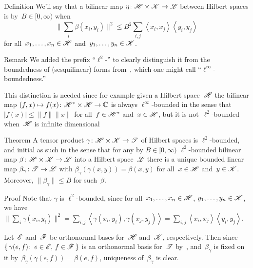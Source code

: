 \documentclass[a]{subfiles}
\begin{document}
\begin{parsec}%
\begin{point}{Definition}%
We'll say that a bilinear map $\eta\colon\mathscr{H}\times\mathscr{K}\to\mathscr{L}$
between Hilbert spaces
is 
by~$B\in [0,\infty)$
when
\begin{equation*}
	\|\sum_{i}\beta(x_i,y_i)\|^2
\leq B^2 \sum_{i,j}\left<x_i,x_j\right>\left<y_i,y_j\right>
\end{equation*}
for all~$x_1,\dotsc,x_n\in \mathscr{H}$
and~$y_1,\dotsc,y_n\in\mathscr{K}$.
\begin{point}{Remark}%
We added the prefix ``$\ell^2$-''
to clearly distinguish
it from the boundedness
of (sesquilinear) forms from~,
which one might call ``$\ell^\infty$-boundedness.''

This distinction is needed
since for example given a Hilbert space~$\mathscr{H}$ the
bilinear map $(f,x)\mapsto f(x)\colon \mathscr{H}^*\times \mathscr{H}\to\mathbb{C}$
is always $\ell^\infty$-bounded in the 
sense that~$\left|f(x)\right|\leq \|f\|\|x\|$
for all~$f\in\mathscr{H}^*$ and~$x\in\mathscr{H}$,
but it is not~$\ell^2$-bounded
when~$\mathscr{H}$ is infinite dimensional
\end{point}
\end{point}
\begin{point}{Theorem}%
A tensor product $\gamma\colon \mathscr{H}\times\mathscr{K}\to\mathscr{T}$
of Hilbert spaces
is $\ell^2$-bounded,
and initial as such 
in the sense
that for any by $B\in [0,\infty)$ 
$\ell^2$-bounded bilinear map $\beta\colon \mathscr{H}\times\mathscr{K} \to\mathscr{L}$
into a Hilbert space~$\mathscr{L}$
there is a unique bounded linear map $\beta_\gamma\colon\mathscr{T}
\to\mathscr{L}$
with $\beta_\gamma(\gamma(x,y))=\beta(x,y)$
for all~$x\in\mathscr{H}$ and~$y\in\mathscr{K}$.
Moreover, $\|\beta_\gamma\|\leq B$
for such~$\beta$.
\begin{point}{Proof}%
Note that $\gamma$ is $\ell^2$-bounded,
since
for all~$x_1,\dotsc,x_n\in\mathscr{H}$,
$y_1,\dotsc,y_n\in\mathscr{K}$,
we have
$\|\sum_i\gamma(x_i,y_i)\|^2
= \sum_{i,j}\left<\gamma(x_i,y_i),
\gamma(x_j,y_j)\right>
= \sum_{i,j} \left<x_i,x_j\right>\left<y_i,y_j\right>$.

Let~$\mathscr{E}$ and~$\mathscr{F}$
be orthonormal bases
for~$\mathscr{H}$ and~$\mathscr{K}$, respectively.
Then since~$\{\,\gamma(e,f)\colon\,e\in\mathscr{E},\,f\in\mathscr{F}\,\}$
is an orthonormal basis for~$\mathscr{T}$
by~,
and~$\beta_\gamma$
is fixed on it by~$\beta_\gamma(\gamma(e,f))=\beta(e,f)$,
uniqueness of~$\beta_\gamma$ is clear.


\end{point}
\end{point}
\end{parsec}
\end{document}
